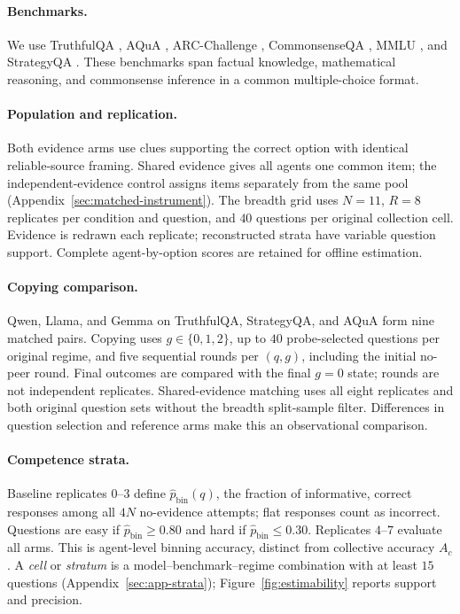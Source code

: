\documentclass[11pt,a4paper]{article}
\theoremstyle{definition}
\begin{document}
\paragraph{Benchmarks.}
We use TruthfulQA \citep{lin-etal-2022-truthfulqa}, AQuA \citep{ling-etal-2017-program}, ARC-Challenge \citep{clark-etal-2018-arc}, CommonsenseQA \citep{talmor-etal-2019-commonsenseqa}, MMLU \citep{hendrycks-etal-2021-mmlu}, and StrategyQA \citep{geva-etal-2021-strategyqa}.
These benchmarks span factual knowledge, mathematical reasoning, and commonsense inference in a common multiple-choice format.

\paragraph{Population and replication.}
Both evidence arms use clues supporting the correct option with identical
reliable-source framing. Shared evidence gives all agents one common item;
the independent-evidence control assigns items separately from the same pool
(Appendix~\ref{sec:matched-instrument}). The breadth grid uses $N=11$,
$R=8$ replicates per condition and question,
and $40$ questions per original collection cell. Evidence is redrawn each
replicate; reconstructed strata have variable question support. Complete
agent-by-option scores are retained for offline estimation.

\paragraph{Copying comparison.}
Qwen, Llama, and Gemma on TruthfulQA, StrategyQA, and AQuA form nine matched
pairs. Copying uses $g\in\{0,1,2\}$, up to $40$ probe-selected questions per
original regime, and five sequential rounds per $(q,g)$, including the
initial no-peer round. Final outcomes are compared with the final $g=0$
state; rounds are not independent replicates. Shared-evidence matching uses
all eight replicates and both original question sets without the breadth
split-sample filter. Differences in question selection and reference arms
make this an observational comparison.

\paragraph{Competence strata.}
Baseline replicates $0$--$3$ define $\widehat p_{\mathrm{bin}}(q)$, the
fraction of informative, correct responses among all $4N$ no-evidence
attempts; flat responses count as incorrect. Questions are easy if
$\widehat p_{\mathrm{bin}}\ge0.80$ and hard if
$\widehat p_{\mathrm{bin}}\le0.30$. Replicates $4$--$7$ evaluate all arms.
This is agent-level binning accuracy, distinct from collective accuracy
$A_c$. A \emph{cell} or \emph{stratum} is a model--benchmark--regime
combination with at least $15$ questions (Appendix~\ref{sec:app-strata});
Figure~\ref{fig:estimability} reports support and precision.
\end{document}
